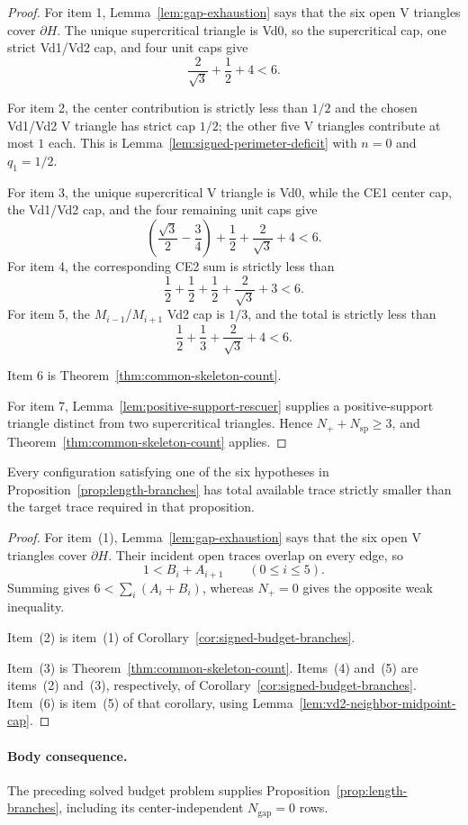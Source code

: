 \begin{proof}
For item 1, Lemma~\ref{lem:gap-exhaustion} says that the six open V
triangles cover $\partial H$.  The unique supercritical triangle is Vd0, so
the supercritical cap, one strict Vd1/Vd2 cap, and four unit caps give
\[
 \frac2{\sqrt3}+\frac12+4<6.
\]

For item 2, the center contribution is strictly less than $1/2$ and the
chosen Vd1/Vd2 V triangle has strict cap $1/2$; the other five V triangles contribute at
most $1$ each. This is Lemma~\ref{lem:signed-perimeter-deficit} with
$n=0$ and $q_1=1/2$.

For item 3, the unique supercritical V triangle is Vd0, while the CE1 center cap,
the Vd1/Vd2 cap, and the four remaining unit caps give
\[
 \left(\frac{\sqrt3}{2}-\frac34\right)
 +\frac12+\frac2{\sqrt3}+4<6.
\]
For item 4, the corresponding CE2 sum is strictly less than
\[
 \frac12+\frac12+\frac12+\frac2{\sqrt3}+3<6.
\]
For item 5, the $M_{i-1}$/$M_{i+1}$ Vd2 cap is $1/3$, and the total is
strictly less than
\[
 \frac12+\frac13+\frac2{\sqrt3}+4<6.
\]

Item 6 is Theorem~\ref{thm:common-skeleton-count}.

For item 7, Lemma~\ref{lem:positive-support-rescuer} supplies a
positive-support triangle distinct from two supercritical triangles.  Hence
$N_++N_{\mathrm{sp}}\ge3$, and
Theorem~\ref{thm:common-skeleton-count} applies.
\end{proof}

\begin{lemma}
\label{lem:app-length-branch-calculation}
Every configuration satisfying one of the six hypotheses in
Proposition~\ref{prop:length-branches} has total available trace strictly
smaller than the target trace required in that proposition.
\end{lemma}

\begin{proof}
For item~(1), Lemma~\ref{lem:gap-exhaustion} says that the six open V
triangles cover $\partial H$.  Their incident open traces overlap on every
edge, so
\[
 1<B_i+A_{i+1}\qquad(0\le i\le5).
\]
Summing gives $6<\sum_i(A_i+B_i)$, whereas $N_+=0$ gives the opposite weak
inequality.

Item~(2) is item~(1) of Corollary~\ref{cor:signed-budget-branches}.

Item~(3) is Theorem~\ref{thm:common-skeleton-count}.  Items~(4) and~(5) are
items~(2) and~(3), respectively, of
Corollary~\ref{cor:signed-budget-branches}.  Item~(6) is item~(5) of that
corollary, using Lemma~\ref{lem:vd2-neighbor-midpoint-cap}.
\end{proof}

\paragraph{Body consequence.}
The preceding solved budget problem supplies
Proposition~\ref{prop:length-branches}, including its center-independent
$N_{\mathrm{gap}}=0$ rows.
